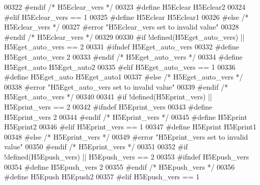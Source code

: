 \begin{DoxyCode}
00322 \textcolor{preprocessor}{  #endif }\textcolor{comment}{/* H5Eclear\_vers */}\textcolor{preprocessor}{}
00323 \textcolor{preprocessor}{  #define H5Eclear H5Eclear2}
00324 \textcolor{preprocessor}{#elif H5Eclear\_vers == 1}
00325 \textcolor{preprocessor}{  #define H5Eclear H5Eclear1}
00326 \textcolor{preprocessor}{#else }\textcolor{comment}{/* H5Eclear\_vers */}\textcolor{preprocessor}{}
00327 \textcolor{preprocessor}{  #error "H5Eclear\_vers set to invalid value"}
00328 \textcolor{preprocessor}{#endif }\textcolor{comment}{/* H5Eclear\_vers */}\textcolor{preprocessor}{}
00329 
00330 \textcolor{preprocessor}{#if !defined(H5Eget\_auto\_vers) || H5Eget\_auto\_vers == 2}
00331 \textcolor{preprocessor}{  #ifndef H5Eget\_auto\_vers}
00332 \textcolor{preprocessor}{    #define H5Eget\_auto\_vers 2}
00333 \textcolor{preprocessor}{  #endif }\textcolor{comment}{/* H5Eget\_auto\_vers */}\textcolor{preprocessor}{}
00334 \textcolor{preprocessor}{  #define H5Eget\_auto H5Eget\_auto2}
00335 \textcolor{preprocessor}{#elif H5Eget\_auto\_vers == 1}
00336 \textcolor{preprocessor}{  #define H5Eget\_auto H5Eget\_auto1}
00337 \textcolor{preprocessor}{#else }\textcolor{comment}{/* H5Eget\_auto\_vers */}\textcolor{preprocessor}{}
00338 \textcolor{preprocessor}{  #error "H5Eget\_auto\_vers set to invalid value"}
00339 \textcolor{preprocessor}{#endif }\textcolor{comment}{/* H5Eget\_auto\_vers */}\textcolor{preprocessor}{}
00340 
00341 \textcolor{preprocessor}{#if !defined(H5Eprint\_vers) || H5Eprint\_vers == 2}
00342 \textcolor{preprocessor}{  #ifndef H5Eprint\_vers}
00343 \textcolor{preprocessor}{    #define H5Eprint\_vers 2}
00344 \textcolor{preprocessor}{  #endif }\textcolor{comment}{/* H5Eprint\_vers */}\textcolor{preprocessor}{}
00345 \textcolor{preprocessor}{  #define H5Eprint H5Eprint2}
00346 \textcolor{preprocessor}{#elif H5Eprint\_vers == 1}
00347 \textcolor{preprocessor}{  #define H5Eprint H5Eprint1}
00348 \textcolor{preprocessor}{#else }\textcolor{comment}{/* H5Eprint\_vers */}\textcolor{preprocessor}{}
00349 \textcolor{preprocessor}{  #error "H5Eprint\_vers set to invalid value"}
00350 \textcolor{preprocessor}{#endif }\textcolor{comment}{/* H5Eprint\_vers */}\textcolor{preprocessor}{}
00351 
00352 \textcolor{preprocessor}{#if !defined(H5Epush\_vers) || H5Epush\_vers == 2}
00353 \textcolor{preprocessor}{  #ifndef H5Epush\_vers}
00354 \textcolor{preprocessor}{    #define H5Epush\_vers 2}
00355 \textcolor{preprocessor}{  #endif }\textcolor{comment}{/* H5Epush\_vers */}\textcolor{preprocessor}{}
00356 \textcolor{preprocessor}{  #define H5Epush H5Epush2}
00357 \textcolor{preprocessor}{#elif H5Epush\_vers == 1}

\end{DoxyCode}
